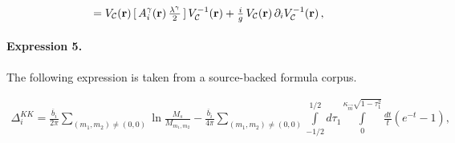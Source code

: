\documentclass[11pt]{article}
\begin{document}
\begin{align*}[\,A_{{\sf GI}\,i}^{{\gamma}}({\bf{r}})\,{\textstyle\frac{{\lambda}^{\gamma}}{2}}\,]=V_{\cal{C}}({\bf{r}})\,[\,A_{i}^{\gamma}({\bf{r}})\,{\textstyle\frac{\lambda^\gamma}{2}}\,]\,V_{\cal{C}}^{-1}({\bf{r}})+{\textstyle\frac{i}{g}}\,V_{\cal{C}}({\bf{r}})\,\partial_{i}V_{\cal{C}}^{-1}({\bf{r}})\,,\end{align*}

\paragraph{Expression 5.} The following expression is taken from a source-backed formula corpus.

\begin{align*}\Delta_{i}^{KK}=\frac{{\overline{b}_{i}}}{2\pi }\sum_{(m_{1},m_{2})\not=(0,0)}^{{}}\ln \frac{M_{s}}{M_{m_1,m_2}}-\frac{{\overline{b}_{i}}}{4\pi }\sum_{(m_{1},m_{2})\not=(0,0)}^{{}}\int\limits_{-1/2}^{1/2}d\tau_{1}\int\limits_{0}^{\kappa _{\vec{m}}\sqrt{1-\tau _{1}^{2}}}\frac{dt}{t}(e^{-t}-1), \end{align*}
\end{document}
